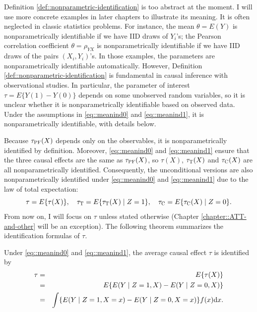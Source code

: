 Definition \ref{def::nonparametric-identification} is too abstract at the moment. I will use more concrete examples in later chapters to illustrate its meaning. It is often neglected in classic statistics problems. For instance, the mean $\theta = E(Y)$ is nonparametrically identifiable if we have IID draws of $Y_i$'s; the Pearson correlation coefficient $\theta = \rho_{YX}$ is nonparametrically identifiable if we have IID draws of the pairs $(X_i, Y_i)$'s. In those examples, the parameters are nonparametrically identifiable automatically. However, Definition \ref{def::nonparametric-identification} is fundamental in causal inference with observational studies. In particular, the parameter of interest $\tau = E\{ Y(1)  - Y(0)\}$ depends on some unobserved random variables, so it is unclear whether it is nonparametrically identifiable based on observed data. Under the assumptions in \eqref{eq::meanind0} and \eqref{eq::meanind1}, it is nonparametrically identifiable, with details below. 


 Because $   \tau_\textsc{PF}(X)$ depends only on the observables, it is nonparametrically identified by definition. Moreover, \eqref{eq::meanind0} and \eqref{eq::meanind1} ensure that the three causal effects are the same as $   \tau_\textsc{PF}(X)$, so $\tau(X) $, $\tau_\textsc{T}(X) $ and $  \tau_\textsc{C}(X)$ are all nonparametrically identified. Consequently, the unconditional versions are also nonparametrically identified under \eqref{eq::meanind0} and \eqref{eq::meanind1} due to the law of total expectation:
 $$
 \tau = E\{ \tau(X)\},\quad
 \tau_\textsc{T} = E\{  \tau_\textsc{T}(X) \mid Z=1  \}, \quad
   \tau_\textsc{C} = E\{   \tau_\textsc{C}(X) \mid Z=0 \}.
 $$
 From now on, I will focus on $\tau$ unless stated otherwise (Chapter \ref{chapter::ATT-and-other} will be an exception). The following theorem summarizes the identification formulas of $\tau$. 
 
\begin{theorem}
\label{thm::identification-formula}
Under \eqref{eq::meanind0} and \eqref{eq::meanind1}, the average causal effect $\tau$ is identified by 
 \begin{eqnarray} 
 \tau &=& E\{ \tau(X)\} \\
 &=& E\{  E(Y\mid Z=1, X) - E(Y\mid Z=0, X) \} \label{eq::nonparametric-identification-tau} \\
 &=&  \int \{  E(Y\mid Z=1, X=x) - E(Y\mid Z=0, X=x)\} f(x) \diff x.
 \end{eqnarray}
\end{theorem} 
 
